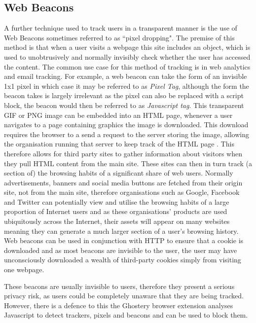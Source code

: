 \documentclass{article}
\begin{document}
\subsection{Web Beacons}
A further technique used to track users in a transparent manner is the use of Web Beacons sometimes referred to as ``pixel dropping". The premise of this method is that when a user visits a webpage this site includes an object, which is used to unobtrusively and normally invisibly check whether the user has accessed the content. The common use case for this method of tracking is in web analytics and email tracking. For example, a web beacon can take the form of an invisible 1x1 pixel in which case it may be referred to as \textit{Pixel Tag}, although the form the beacon takes is largely irrelevant as the pixel can also be replaced with a script block, the beacon would then be referred to as \textit{Javascript tag}. This transparent GIF or PNG image can be embedded into an HTML page, whenever a user navigates to a page containing graphics the image is downloaded. This download requires the browser to a send a request to the server storing the image, allowing the organisation running that server to keep track of the HTML page \parencite{}. This therefore allows for third party sites to gather information about visitors when they pull HTML content from the main site. These sites can then in turn track (a section of) the browsing habits of a significant share of web users. Normally advertisements, banners and social media buttons are fetched from their origin site, not from the main site, therefore organisations such as Google, Facebook and Twitter can potentially view and utilise the browsing habits of a large proportion of Internet users and as these organisations' products are used ubiquitously across the Internet, their assets will appear on many websites meaning they can generate a much larger section of a user's browsing history.   Web beacons can be used in conjunction with HTTP to ensure that a cookie is downloaded and as most beacons are invisible to the user, the user may have unconsciously downloaded a wealth of third-party cookies simply from visiting one webpage. \newline

These beacons are usually invisible to users, therefore they present a serious privacy risk, as users could be completely unaware that they are being tracked. However, there is a defence to this the Ghostery browser extension analyses Javascript to detect trackers, pixels and beacons and can be used to block them. 
    
\end{document}
